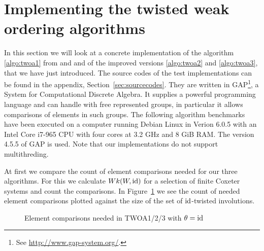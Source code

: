 \section{Implementing the twisted weak ordering algorithms}
\label{sec:implementing-twisted-involutions-algorithms}

In this section we will look at a concrete implementation of the algorithm \ref{algo:twoa1} from \cite{brennemann:twoa} and \cite{haas:twoa} and of the improved versions \ref{algo:twoa2} and \ref{algo:twoa3}, that we have just introduced. The source codes of the test implementations can be found in the appendix, Section~\ref{sec:sourcecodes}. They are written in GAP\footnote{See \url{http://www.gap-system.org/}.}, a System for Computational Discrete Algebra. It supplies a powerful programming language and can handle with free represented groups, in particular it allows comparisons of elements in such groups. The following algorithm benchmarks have been executed on a computer running Debian Linux in Verion 6.0.5 with an Intel\textsuperscript{\textregistered} Core\textsuperscript{\texttrademark} i7-965 CPU with four cores at 3.2 GHz and 8 GiB RAM. The version 4.5.5 of GAP is used. Note that our implementations do not support multithreding.

At first we compare the count of element comparisons needed for our three algorithms. For this we calculate $Wk(W,\operatorname{id})$ for a selection of finite Coxeter systems and count the comparisons. In Figure~\ref{fig:twoa123-element-comparisons} we see the count of needed element comparisons plotted against the size of the set of $\operatorname{id}$-twisted involutions.

\begin{figure}[ht]
	\centering
	\caption{Element comparisons needed in TWOA1/2/3 with $\theta = \operatorname{id}$}
	\label{fig:twoa123-element-comparisons}
\end{figure}

